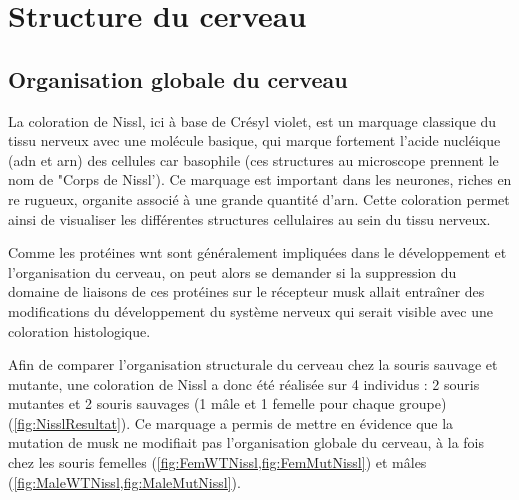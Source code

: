 \section{Structure du cerveau}
\label{sec:NisslResultat}

	\subsection{Organisation globale du cerveau}
	\label{ssec:orgaglobale}
		La coloration de Nissl, ici à base de Crésyl violet, est un marquage classique du tissu nerveux avec une molécule basique, qui marque fortement l'acide nucléique (\acrshort{adn} et \acrshort{arn}) des cellules car basophile (ces structures au microscope prennent le nom de "Corps de Nissl'). Ce marquage est important dans les neurones, riches en \gls{re} rugueux, organite associé à une grande quantité d'\acrshort{arn}. Cette coloration permet ainsi de visualiser les différentes structures cellulaires au sein du tissu nerveux.
	
		Comme les protéines \gls{wnt} sont généralement impliquées dans le développement et l'organisation du cerveau, on peut alors se demander si la suppression du domaine de liaisons de ces protéines sur le récepteur \gls{musk} allait entraîner des modifications du développement du système nerveux qui serait visible avec une coloration histologique.
	
		Afin de comparer l'organisation structurale du cerveau chez la souris sauvage et mutante, une coloration de Nissl a donc été réalisée sur 4 individus : 2 souris mutantes et 2 souris sauvages (1 mâle et 1 femelle pour chaque groupe) (\cref{fig:NisslResultat}). Ce marquage a permis de mettre en évidence que la mutation de \gls{musk} ne modifiait pas l'organisation globale du cerveau, à la fois chez les souris femelles (\cref{fig:FemWTNissl,fig:FemMutNissl}) et mâles (\cref{fig:MaleWTNissl,fig:MaleMutNissl}). 
	

